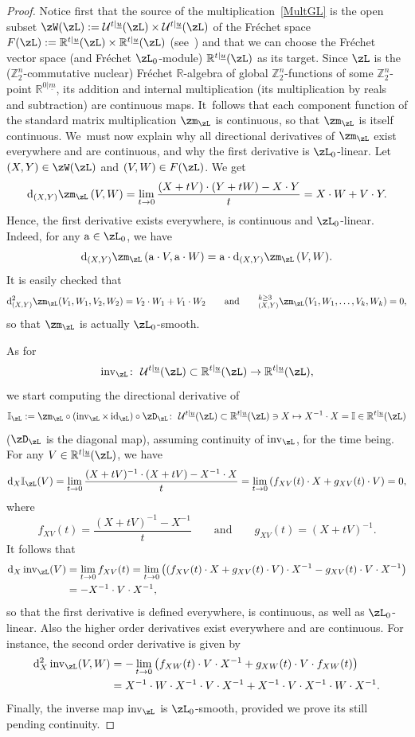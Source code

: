 \documentclass[pdftex]{sigma}%
\newcommand{\op}[1]{\operatorname{#1}}
\newcommand{\R}{{\mathbb R}}
\newcommand{\Z}{{\mathbb Z}}
\def\ul{\underline}
\def\cU{\mathcal{U}}
\def\ul{\underline}
\newcommand{\0}{\otimes}
\newcommand{\id}{\op{id}}
\newcommand{\z}{\Z_2^n}
\numberwithin{equation}{section}
\begin{document}
\begin{proof}
Notice first that the source of the multiplication~\eqref{MultGL} is the open subset $\zW(\zL):=\cU^{t|\ul u}(\zL)\times\cU^{t|\ul u}(\zL)$ of the Fr\'echet space $F(\zL):=\R^{t|\ul u}(\zL)\times\R^{t|\ul u}(\zL)$ (see~\cite{Bruce:2019b}) and that we can choose the Fr\'echet vector space (and Fr\'echet $\zL_0$-module) $\R^{t|\ul u}(\zL)$ as its target. Since $\zL$ is the ($\z$-commutative nuclear) Fr\'echet $\R$-algebra of global $\z$-functions of some $\z$-point $\R^{0|\ul m}$, its addition and internal multiplication (its multiplication by reals and subtraction) are continuous maps. It~follows that each component function of the standard matrix multiplication $\zm_\zL$ is continuous, so that $\zm_\zL$ is itself continuous. We~must now explain why all directional derivatives of $\zm_\zL$ exist everywhere and are continuous, and why the first derivative is $\zL_0$-linear. Let $(X,Y)\in\zW(\zL)$ and $(V,W)\in F(\zL)$. We get
\[
{\rm d}_{(X,Y)}\zm_\zL\,(V,W)=\lim_{t\to 0}\frac{(X+tV)\cdot(Y+tW)-X\cdot Y}{t}=X\cdot W+V\cdot Y.
\]
Hence, the first derivative exists everywhere, is continuous and $\zL_0$-linear. Indeed, for any ${\rm a}\in\zL_0$, we have
\[
{\rm d}_{(X,Y)}\zm_\zL\,({\rm a}\cdot V,{\rm a}\cdot W)={\rm a}\cdot {\rm d}_{(X,Y)}\zm_\zL\,(V,W).
\]
It is easily checked that
\[
{\rm d}^2_{(X,Y)}\zm_\zL(V_1,W_1,V_2,W_2)=V_2\cdot W_1+V_1\cdot W_2\qquad\text{and}\qquad
{\rm }^{k\ge 3}_{(X,Y)}\zm_\zL(V_1,W_1,\dots,V_k,W_k)=0,
\]
so that $\zm_\zL$ is actually $\zL_0$-smooth.

As for
\[
\op{inv}_\zL\colon\ \cU^{t|\ul u}(\zL)\subset\R^{t|\ul u}(\zL)\to \R^{t|\ul u}(\zL),
\]
we start computing the directional derivative of
\[
\mathbb{I}_\zL:=\zm_\zL \circ (\op{inv}_\zL\times\id_\zL)\circ\zD_\zL\colon\ \cU^{t|\ul u}(\zL)\subset\R^{t|\ul u}(\zL)\ni X\mapsto X^{-1}\cdot X=\mathbb{I}\in\R^{t|\ul u}(\zL)
\]
($\zD_\zL$ is the diagonal map), assuming continuity of $\op{inv}_\zL$, for the time being. For any $V\in\R^{t|\ul u}(\zL)$, we have
\[
{\rm d}_X\mathbb{I}_\zL(V)=\lim_{t\to 0}\frac{(X+tV)^{-1}\cdot (X+tV)-X^{-1}\cdot X}{t}=\lim_{t\to 0}\left(f_{XV}(t)\cdot X +g_{XV}(t)\cdot V\right)=0,
\]
where
\[
f_{XV}(t)=\frac{(X+tV)^{-1}-X^{-1}}{t}\qquad\text{and}\qquad g_{XV}(t)=(X+tV)^{-1}.
\]
It follows that
\begin{align*}
{\rm d}_X\op{inv}_\zL(V)&=\lim_{t\to 0}f_{XV}(t)=\lim_{t\to 0}\big((f_{XV}(t)\cdot X+g_{XV}(t)\cdot V)\cdot X^{-1}-g_{XV}(t)\cdot V\cdot X^{-1}\big)
\\
&=-X^{-1}\cdot V\cdot X^{-1},
\end{align*}
so that the first derivative is defined everywhere, is continuous, as well as $\zL_0$-linear. Also the higher order derivatives exist everywhere and are continuous. For instance, the second order derivative is given by
\begin{align*}
{\rm d}^2_X\op{inv}_\zL(V,W)&=-\lim_{t\to 0}\big(f_{XW}(t)\cdot V\cdot X^{-1}+g_{XW}(t)\cdot V\cdot f_{XW}(t)\big)\nonumber \\ &=X^{-1}\cdot W\cdot X^{-1}\cdot V\cdot X^{-1}+X^{-1}\cdot V\cdot X^{-1}\cdot W\cdot X^{-1}.
\end{align*}
Finally, the inverse map $\op{inv}_\zL$ is $\zL_0$-smooth, provided we prove its still pending continuity.


\end{proof}
\end{document}

